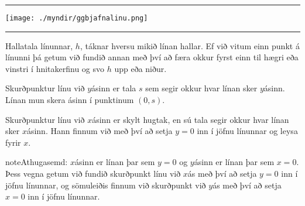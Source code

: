 \documentclass[a4paper,10pt,icelandic]{sphinxmanual}
\begin{document}
\bigskip\hrule\bigskip



\begin{center}
\texttt{[image: ./myndir/ggbjafnalinu.png]}
\end{center}



\bigskip\hrule\bigskip


Hallatala línunnar, \(h\), táknar hversu mikið línan hallar. Ef við vitum einn punkt á línunni þá getum við fundið annan með því að færa okkur fyrst einn til hægri eða vinstri í hnitakerfinu og svo \(h\) upp eða niður.

Skurðpunktur línu við \(y\)\sphinxhyphen{}ásinn er tala \(s\) sem segir okkur hvar línan sker \(y\)\sphinxhyphen{}ásinn. Línan mun skera ásinn í punktinum \((0,s)\).

Skurðpunktur línu við \(x\)\sphinxhyphen{}ásinn er skylt hugtak, en sú tala segir okkur hvar línan sker \(x\)\sphinxhyphen{}ásinn. Hann finnum við með því að setja \(y=0\) inn í jöfnu línunnar og leysa fyrir \(x\).

\begin{sphinxadmonition}{note}{Athugasemd:}
\(x\)\sphinxhyphen{}ásinn er línan þar sem \(y=0\) og \(y\)\sphinxhyphen{}ásinn er línan þar sem \(x=0\). Þess vegna getum við fundið skurðpunkt línu við \(x\)\sphinxhyphen{}ás með því að setja \(y=0\) inn í jöfnu línunnar, og sömuleiðis finnum við skurðpunkt við \(y\)\sphinxhyphen{}ás með því að setja \(x=0\) inn í jöfnu línunnar.
\end{sphinxadmonition}
\end{document}
